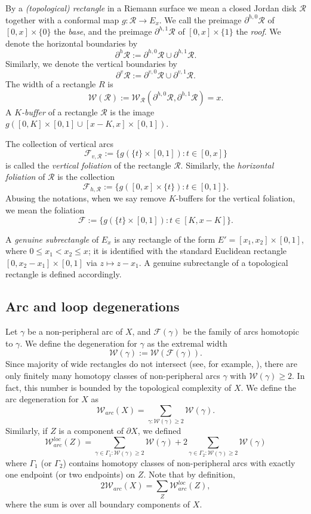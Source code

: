 \documentclass[11pt, reqno]{amsart}
\numberwithin{equation}{section}
\theoremstyle{plain}
\theoremstyle{theorem}
\theoremstyle{plain}
\theoremstyle{definition}
\numberwithin{figure}{section}
\begin{document}
By a \emph{(topological) rectangle} in a Riemann surface we mean a closed Jordan disk $\mathcal{R}$ together with a conformal map $g: \mathcal{R} \longrightarrow E_x$.
We call the preimage $\partial^{h, 0}\mathcal{R}$ of $[0,x] \times\{0\}$ the {\em base}, and the preimage $\partial^{h, 1}\mathcal{R}$ of $[0,x] \times \{1\}$ the {\em roof}.
We denote the horizontal boundaries by
$$
\partial^h \mathcal{R} := \partial^{h, 0}\mathcal{R} \cup \partial^{h, 1}\mathcal{R}.
$$
Similarly, we denote the vertical boundaries by
$$
\partial^v \mathcal{R} := \partial^{v, 0}\mathcal{R} \cup \partial^{v, 1}\mathcal{R}.
$$
The width of a rectangle $R$ is 
$$
\mathcal{W}(\mathcal{R}) := \mathcal{W}_\mathcal{R}(\partial^{h, 0}\mathcal{R}, \partial^{h, 1}\mathcal{R}) = x.
$$
A {\em $K$-buffer} of a rectangle $\mathcal{R}$ is the image $g([0,K] \times [0,1] \cup [x-K,x]\times [0,1])$.

The collection of vertical arcs 
$$
\mathcal{F}_{v, \mathcal{R}} :=\{g(\{t\} \times [0,1]): t\in [0,x]\}
$$
is called the {\em vertical foliation} of the rectangle $\mathcal{R}$. Similarly, the {\em horizontal foliation} of $\mathcal{R}$ is the collection
$$
\mathcal{F}_{h, \mathcal{R}} :=\{g([0,x] \times \{t\}): t\in [0,1]\}.
$$
Abusing the notations, when we say remove $K$-buffers for the vertical foliation, we mean the foliation
$$
\mathcal{F} :=\{g(\{t\} \times [0,1]): t\in [K,x-K]\}.
$$

A \emph{genuine subrectangle} of $E_x$ is any rectangle of the form $E'=[x_1,x_2]\times [0,1]$, where $0\le x_1<x_2\le x$; it is identified with the standard Euclidean rectangle $[0,x_2-x_1]\times [0,1]$ via $z\mapsto z- x_1$. A genuine subrectangle of a topological rectangle is defined accordingly. 

\subsection{Arc and loop degenerations}\label{subsec:ald}
Let $\gamma$ be a non-peripheral arc of $X$, and $\mathcal{F}(\gamma)$ be the family of arcs homotopic to $\gamma$.
We define the degeneration for $\gamma$ as the extremal width
$$
\mathcal{W}(\gamma) := \mathcal{W}(\mathcal{F}(\gamma)).
$$
Since majority of wide rectangles do not intersect (see, for example, \cite[\S 3]{Kah06}), there are only finitely many homotopy classes of non-peripheral arcs $\gamma$ with $\mathcal{W}(\gamma) \geq 2$.
In fact, this number is bounded by the topological complexity of $X$.
We define the arc degeneration for $X$ as
$$
\mathcal{W}_{arc}(X) = \sum_{\gamma: \mathcal{W}(\gamma) \geq 2} \mathcal{W}(\gamma).
$$
Similarly, if $Z$ is a component of $\partial X$, we defined 
$$
\mathcal{W}^{loc}_{arc}(Z) = \sum_{\gamma \in \Gamma_1: \mathcal{W}(\gamma) \geq 2} \mathcal{W}(\gamma) + 2\sum_{\gamma\in \Gamma_2: \mathcal{W}(\gamma) \geq 2} \mathcal{W}(\gamma)
$$ 
where $\Gamma_1$ (or $\Gamma_2$) contains homotopy classes of non-peripheral arcs with exactly one endpoint (or two endpoints) on $Z$.
Note that by definition,
$$
2\mathcal{W}_{arc}(X) = \sum_Z \mathcal{W}^{loc}_{arc}(Z),
$$
where the sum is over all boundary components of $X$.
\end{document}
